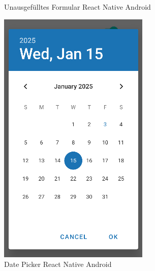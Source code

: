 \begin{figure}[H]
\begin{minipage}{0.45\textwidth}
        \caption{Unausgefülltes Formular React Native Android}
    \end{minipage}
    \hfill
    \begin{minipage}{0.45\textwidth}
        \centering
        \includegraphics[width=\linewidth]{images/form/android/react_native/dateOpen.png}
        \caption{Date Picker React Native Android}
    \end{minipage}

    \vspace{0.5cm}


\end{figure}

